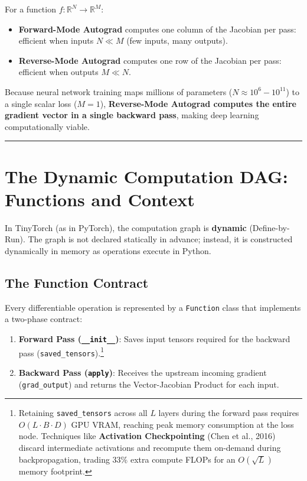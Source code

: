\documentclass[
  letterpaper,
]{scrbook}
\providecommand{\tightlist}{%
  \setlength{\itemsep}{0pt}\setlength{\parskip}{0pt}}
\begin{document}
For a function \(f: \mathbb{R}^N \to \mathbb{R}^M\):

\begin{itemize}
\tightlist
\item
  \textbf{Forward-Mode Autograd} computes one column of the Jacobian per
  pass: efficient when inputs \(N \ll M\) (few inputs, many outputs).
\item
  \textbf{Reverse-Mode Autograd} computes one row of the Jacobian per
  pass: efficient when outputs \(M \ll N\).
\end{itemize}

Because neural network training maps millions of parameters
(\(N \approx 10^6 - 10^{11}\)) to a single scalar loss (\(M = 1\)),
\textbf{Reverse-Mode Autograd computes the entire gradient vector in a
single backward pass}, making deep learning computationally viable.

\begin{center}\rule{0.5\linewidth}{0.5pt}\end{center}

\section{The Dynamic Computation DAG: Functions and
Context}\label{the-dynamic-computation-dag-functions-and-context}

In TinyTorch (as in PyTorch), the computation graph is \textbf{dynamic}
(Define-by-Run). The graph is not declared statically in advance;
instead, it is constructed dynamically in memory as operations execute
in Python.

\subsection{The Function Contract}\label{the-function-contract}

Every differentiable operation is represented by a \texttt{Function}
class that implements a two-phase contract:

\begin{enumerate}
\def\labelenumi{\arabic{enumi}.}
\tightlist
\item
  \textbf{Forward Pass (\texttt{\_\_init\_\_})}: Saves input tensors
  required for the backward pass (\texttt{saved\_tensors}).\footnote{Retaining
    \texttt{saved\_tensors} across all \(L\) layers during the forward
    pass requires \(O(L \cdot B \cdot D)\) GPU VRAM, reaching peak
    memory consumption at the loss node. Techniques like
    \textbf{Activation Checkpointing} (Chen et al., 2016) discard
    intermediate activations and recompute them on-demand during
    backpropagation, trading \(33\%\) extra compute FLOPs for an
    \(O(\sqrt{L})\) memory footprint.}
\item
  \textbf{Backward Pass (\texttt{apply})}: Receives the upstream
  incoming gradient (\texttt{grad\_output}) and returns the
  Vector-Jacobian Product for each input.
\end{enumerate}
\end{document}

